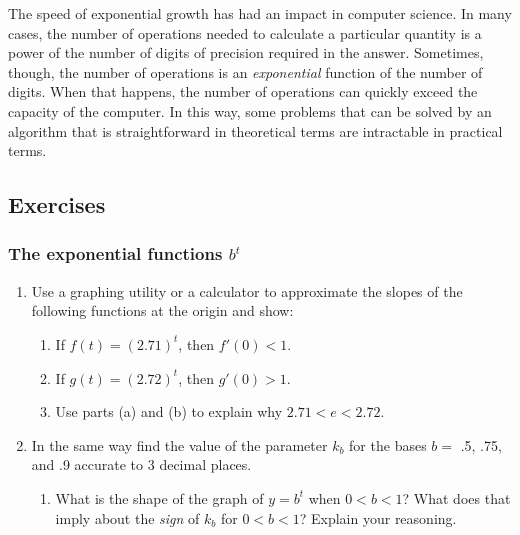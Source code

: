 	The speed of exponential growth has had an impact in computer science.  In many cases, the number of operations needed to calculate a particular quantity is a power of the number of digits of precision required in the answer.  Sometimes, though, the number of operations is an {\em exponential\/} function of the number of digits.  When that happens, the number of operations can quickly exceed the capacity of the computer.  In this way, some problems that can be solved by an algorithm that is straightforward in theoretical terms are intractable in practical terms.  



\subsection{Exercises}
\label{subsec:exercises}

\subsubsection{The exponential functions $b^t$}
\label{subsubsec:the-exponential-functions-bt}



\begin{enumerate}
\item Use a graphing utility or a calculator to approximate the slopes of the following functions at the origin and show:


  \begin{enumerate}
  \item If  $f(t) = (2.71)^t$, then $f'(0)<1$.

  \item If  $g(t) = (2.72)^t$, then $g'(0)>1$.

  \item Use parts (a) and (b) to explain why $2.71 < e < 2.72$.



\end{enumerate}
\item In the same way find the value of the parameter $k_b$ for the bases $b =$ .5, .75, and .9 accurate to 3 decimal places.

  \begin{enumerate}
  \item What is the shape of the graph of $y=b^t$ when $0 < b < 1$?  What does that imply about the {\em sign\/} of $k_b$ for $0 < b < 1$?  Explain your reasoning.


\end{enumerate}
\end{enumerate}
